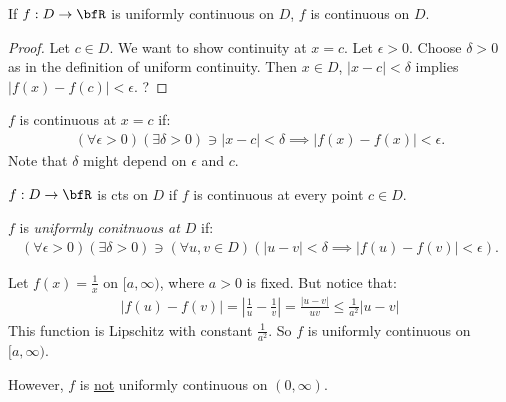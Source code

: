     \begin{proposition}
        If $f:D \rightarrow \bfR$ is uniformly continuous on $D$, $f$ is continuous on $D$.
    \end{proposition}
        \begin{proof}
            Let $c \in D$. We want to show continuity at $x=c$. Let $\epsilon > 0$. Choose $\delta > 0$ as in the definition of uniform continuity. Then $x \in D$, $|x-c|< \delta$ implies $|f(x) - f(c)| < \epsilon$. {\color{red} ?}
        \end{proof}

    \begin{recall}
        $f$ is continuous at $x = c$ if:
            \begin{equation*}
            \begin{split}
                (\forall \epsilon > 0)(\exists \delta > 0) \ni |x-c| < \delta \implies |f(x) - f(x)| < \epsilon.
            \end{split}
            \end{equation*}
        Note that $\delta$ might depend on $\epsilon$ and $c$. \nl
        
        $f:D \rightarrow \bfR$ is cts on $D$ if $f$ is continuous at every point $c \in D$. \nl
        
        $f$ is \textit{uniformly conitnuous at $D$} if:
            \begin{equation*}
            \begin{split}
                (\forall \epsilon > 0)(\exists \delta  > 0) \ni (\forall u,v \in D)(|u-v| < \delta \implies |f(u) - f(v)| < \epsilon).
            \end{split}
            \end{equation*}
    \end{recall}

    \begin{example}
        Let $f(x) = \frac{1}{x}$ on $[a,\infty)$, where $a>0$ is fixed. But notice that:
            \begin{equation*}
            \begin{split}
                |f(u) - f(v)| = \left|\frac{1}{u} - \frac{1}{v}\right| = \frac{|u-v|}{uv} \leq \frac{1}{a^2}|u-v|
            \end{split}
            \end{equation*}
        This function is Lipschitz with constant $\frac{1}{a^2}$. So $f$ is uniformly continuous on $[a,\infty)$. \nl
        
        However, $f$ is \underline{not} uniformly continuous on $(0 ,\infty)$.
    \end{example}

